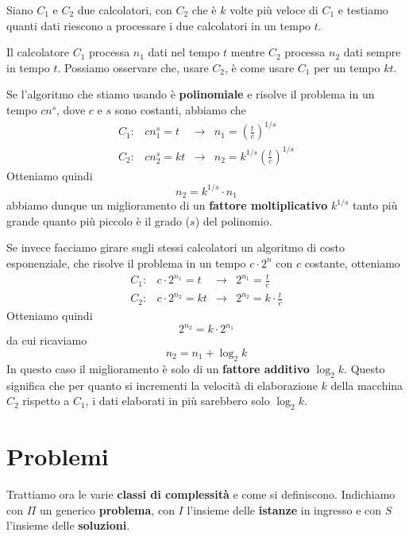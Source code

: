 \begin{example}
	Siano $C_1$ e $C_2$ due calcolatori, con $C_2$ che \`e $k$ volte pi\`u veloce di $C_1$ e testiamo quanti dati
	riescono a processare i due calcolatori in un tempo $t$.

	Il calcolatore $C_1$ processa $n_1$ dati nel tempo $t$ mentre $C_2$ processa $n_2$ dati sempre in tempo $t$.
	Possiamo osservare che, usare $C_2$, \`e come usare $C_1$ per un tempo $kt$.

	Se l'algoritmo che stiamo usando \`e \textbf{polinomiale} e risolve il problema in un tempo $cn^s$, dove
	$c$ e $s$ sono costanti, abbiamo che
	\[	\begin{array}{llcl}
			C_1 : & c n_1^s = t  & \rightarrow &
			n_1 = \left( \displaystyle\frac{t}{c} \right)^{1/s} \\

			C_2 : & c n_2^s = kt & \rightarrow &
			n_2 = k^{1/s}\left( \displaystyle\frac{t}{c} \right)^{1/s}
		\end{array}
	\]
	Otteniamo quindi
	\[ n_2 = k^{1/s} \cdot n_1 \]
	abbiamo dunque un miglioramento di un \textbf{fattore moltiplicativo} $k^{1/s}$ tanto pi\`u grande quanto pi\`u
	piccolo \`e il grado ($s$) del polinomio.

	Se invece facciamo girare sugli stessi calcolatori un algoritmo di costo esponenziale, che risolve il problema in
	un tempo $c \cdot 2^n$ con $c$ costante, otteniamo
	\[
		\begin{array}{llcl}
			C_1 : & c \cdot 2^{n_1} = t   & \rightarrow & 2^{n_1} = \displaystyle\frac{t}{c}         \\
			C_2 : & c \cdot 2^{n_2} = k t & \rightarrow & 2^{n_2} = k \cdot \displaystyle\frac{t}{c}
		\end{array}
	\]
	Otteniamo quindi
	\[ 2^{n_2} = k \cdot 2^{n_1} \]
	da cui ricaviamo
	\[ n_2 = n_1 + \log_2 k \]
	In questo caso il miglioramento \`e solo di un \textbf{fattore additivo} $\log_2 k$. Questo significa che per
	quanto si incrementi la velocit\`a di elaborazione $k$ della macchina $C_2$ rispetto a $C_1$, i dati elaborati in
	pi\`u sarebbero solo $\log_2 k$.
\end{example}

\section{Problemi}\label{problemi}
Trattiamo ora le varie \textbf{classi di complessit\`a} e come si definiscono. Indichiamo con $\Pi$ un generico
\textbf{problema}, con $I$ l'insieme delle \textbf{istanze} in ingresso e con $S$ l'insieme delle \textbf{soluzioni}.

